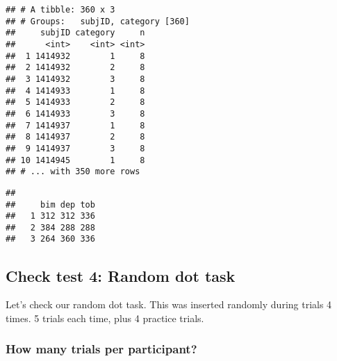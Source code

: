 \documentclass[
]{article}
\newenvironment{Shaded}{\begin{snugshade}}{\end{snugshade}}
\newcommand{\KeywordTok}[1]{\textcolor[rgb]{0.13,0.29,0.53}{\textbf{#1}}}
\newcommand{\NormalTok}[1]{#1}
\newcommand{\OperatorTok}[1]{\textcolor[rgb]{0.81,0.36,0.00}{\textbf{#1}}}
\newcommand{\StringTok}[1]{\textcolor[rgb]{0.31,0.60,0.02}{#1}}
\begin{document}
\begin{verbatim}
## # A tibble: 360 x 3
## # Groups:   subjID, category [360]
##     subjID category     n
##      <int>    <int> <int>
##  1 1414932        1     8
##  2 1414932        2     8
##  3 1414932        3     8
##  4 1414933        1     8
##  5 1414933        2     8
##  6 1414933        3     8
##  7 1414937        1     8
##  8 1414937        2     8
##  9 1414937        3     8
## 10 1414945        1     8
## # ... with 350 more rows
\end{verbatim}

\begin{Shaded}
\end{Shaded}

\begin{verbatim}
##    
##     bim dep tob
##   1 312 312 336
##   2 384 288 288
##   3 264 360 336
\end{verbatim}

\hypertarget{check-test-4-random-dot-task}{%
\subsection{Check test 4: Random dot
task}\label{check-test-4-random-dot-task}}

Let's check our random dot task. This was inserted randomly during
trials 4 times. 5 trials each time, plus 4 practice trials.

\begin{Shaded}
\end{Shaded}

\hypertarget{how-many-trials-per-participant-3}{%
\subsubsection{How many trials per
participant?}\label{how-many-trials-per-participant-3}}

\begin{Shaded}
\end{Shaded}
\end{document}
